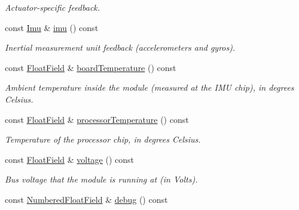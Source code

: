 \begin{DoxyCompactItemize}
\begin{DoxyCompactList}\small\item\em Actuator-\/specific feedback. \end{DoxyCompactList}\item 
const \hyperlink{classhebi_1_1Feedback_1_1Imu}{Imu} \& \hyperlink{classhebi_1_1Feedback_a9907e5aaab3eeaadfee842b0288768d8}{imu} () const \hypertarget{classhebi_1_1Feedback_a9907e5aaab3eeaadfee842b0288768d8}{}\label{classhebi_1_1Feedback_a9907e5aaab3eeaadfee842b0288768d8}

\begin{DoxyCompactList}\small\item\em Inertial measurement unit feedback (accelerometers and gyros). \end{DoxyCompactList}\item 
const \hyperlink{classhebi_1_1Feedback_1_1FloatField}{Float\+Field} \& \hyperlink{classhebi_1_1Feedback_a9e95dacddaa6ca0fa4f3fb0a7a31d9b2}{board\+Temperature} () const \hypertarget{classhebi_1_1Feedback_a9e95dacddaa6ca0fa4f3fb0a7a31d9b2}{}\label{classhebi_1_1Feedback_a9e95dacddaa6ca0fa4f3fb0a7a31d9b2}

\begin{DoxyCompactList}\small\item\em Ambient temperature inside the module (measured at the I\+MU chip), in degrees Celsius. \end{DoxyCompactList}\item 
const \hyperlink{classhebi_1_1Feedback_1_1FloatField}{Float\+Field} \& \hyperlink{classhebi_1_1Feedback_a13cc72584b6d65cad80c90b4ecbb6a72}{processor\+Temperature} () const \hypertarget{classhebi_1_1Feedback_a13cc72584b6d65cad80c90b4ecbb6a72}{}\label{classhebi_1_1Feedback_a13cc72584b6d65cad80c90b4ecbb6a72}

\begin{DoxyCompactList}\small\item\em Temperature of the processor chip, in degrees Celsius. \end{DoxyCompactList}\item 
const \hyperlink{classhebi_1_1Feedback_1_1FloatField}{Float\+Field} \& \hyperlink{classhebi_1_1Feedback_a9aac48c0a099fc2a540280f0e3e30eca}{voltage} () const \hypertarget{classhebi_1_1Feedback_a9aac48c0a099fc2a540280f0e3e30eca}{}\label{classhebi_1_1Feedback_a9aac48c0a099fc2a540280f0e3e30eca}

\begin{DoxyCompactList}\small\item\em Bus voltage that the module is running at (in Volts). \end{DoxyCompactList}\item 
const \hyperlink{classhebi_1_1Feedback_1_1NumberedFloatField}{Numbered\+Float\+Field} \& \hyperlink{classhebi_1_1Feedback_aaeb6f51987d003d4f9168975b8292d9d}{debug} () const \hypertarget{classhebi_1_1Feedback_aaeb6f51987d003d4f9168975b8292d9d}{}\label{classhebi_1_1Feedback_aaeb6f51987d003d4f9168975b8292d9d}


\end{DoxyCompactItemize}
